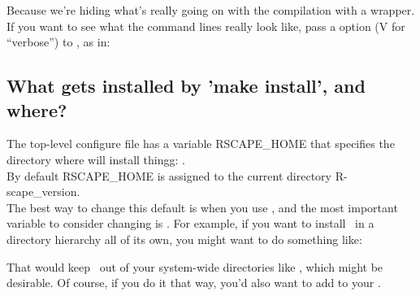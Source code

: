 Because we're hiding what's really going on with the compilation with
a wrapper.  If you want to see what the command lines really look
like, pass a  option (V for ``verbose'') to ,
as in:


\subsection{What gets installed by 'make install', and where?}

The top-level configure file has a variable RSCAPE\_HOME that
specifies the directory where  will install
thingg: .\\

By default RSCAPE\_HOME is assigned to the current directory
R-scape\_version.\\

The best way to change this default is when you use
, and the most important variable to consider
changing is . For example, if you want to install
\rscape\ in a directory hierarchy all of its own, you might want to do
something like:


That would keep \rscape\ out of your system-wide directories like
, which might be desirable. Of course, if you do
it that way, you'd also want to add  to
your .
